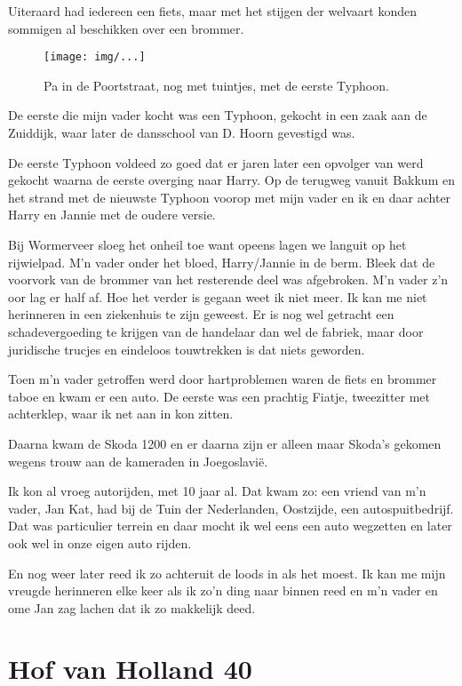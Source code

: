 \documentclass[10pt,twoside,openright]{memoir}
\begin{document}
Uiteraard had iedereen een fiets, maar met het stijgen der welvaart konden sommigen al beschikken over een brommer. 

\begin{figure}[t]
\texttt{[image: img/...]}
\caption{Pa in de Poortstraat, nog met tuintjes, met de eerste Typhoon.}
\end{figure}

De eerste die mijn vader kocht was een Typhoon, gekocht in een zaak aan de Zuiddijk, waar later de dansschool van D. Hoorn gevestigd was. 

De eerste Typhoon voldeed zo goed dat er jaren later een opvolger van werd gekocht waarna de eerste overging naar Harry. Op de terugweg vanuit Bakkum en het strand met de nieuwste Typhoon voorop met mijn vader en ik en daar achter Harry en Jannie met de oudere versie. 

Bij Wormerveer sloeg het onheil toe want opeens lagen we languit op het rijwielpad. M'n vader onder het bloed, Harry/Jannie in de berm. Bleek dat de voorvork van de brommer van het resterende deel was afgebroken. M'n vader z'n oor lag er half af. Hoe het verder is gegaan weet ik niet meer. Ik kan me niet herinneren in een ziekenhuis te zijn geweest. Er is nog wel getracht een schadevergoeding te krijgen van de handelaar dan wel de fabriek, maar door juridische trucjes en eindeloos touwtrekken is dat niets geworden. 

Toen m'n vader getroffen werd door hartproblemen waren de fiets en brommer taboe en kwam er een auto. De eerste was een prachtig Fiatje, tweezitter met achterklep, waar ik net aan in kon zitten. 

Daarna kwam de Skoda 1200 en er daarna zijn er alleen maar Skoda's gekomen wegens trouw aan de kameraden in Joegoslavië. 

Ik kon al vroeg autorijden, met 10 jaar al. Dat kwam zo: een vriend van m'n vader, Jan Kat, had bij de Tuin der Nederlanden, Oostzijde, een autospuitbedrijf. Dat was particulier terrein en daar mocht ik wel eens een auto wegzetten en later ook wel in onze eigen auto rijden. 

En nog weer later reed ik zo achteruit de loods in als het moest. Ik kan me mijn vreugde herinneren elke keer als ik zo'n ding naar binnen reed en m'n vader en ome Jan zag lachen dat ik zo makkelijk deed.

\chapter{Hof van Holland 40} %
\label{cha:hofvanholland}
\end{document}
